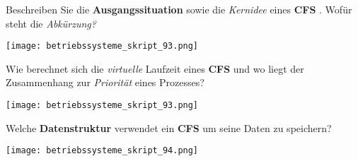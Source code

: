 \documentclass{article}
\begin{document}
\begin{tcolorbox}[colback=white!10!white,colframe=lightgray!75!black,
  savelowerto=\jobname_ex.tex,breakable,enhanced,lines before break=40]

\begin{center}
Beschreiben Sie die 
\textbf{Ausgangssituation
} sowie die 
\textit{Kernidee
} eines 
\textbf{CFS
}. Wofür steht die 
\textit{Abkürzung?
}
\end{center}

\tcblower

\justifying
\begin{center}
\texttt{[image: betriebssysteme\_skript\_93.png]}
\end{center}

\end{tcolorbox}
\begin{tcolorbox}[colback=white!10!white,colframe=lightgray!75!black,
  savelowerto=\jobname_ex.tex,breakable,enhanced,lines before break=40]

\begin{center}
Wie berechnet sich die 
\textit{virtuelle
} Laufzeit eines 
\textbf{CFS
} und wo liegt der Zusammenhang zur 
\textit{Priorität
} eines Prozesses?

\end{center}

\tcblower

\justifying
\begin{center}
\texttt{[image: betriebssysteme\_skript\_93.png]}
\end{center}

\end{tcolorbox}
\begin{tcolorbox}[colback=white!10!white,colframe=lightgray!75!black,
  savelowerto=\jobname_ex.tex,breakable,enhanced,lines before break=40]

\begin{center}
Welche 
\textbf{Datenstruktur
} verwendet ein 
\textbf{CFS
} um seine Daten zu speichern?

\end{center}

\tcblower

\justifying
\begin{center}
\texttt{[image: betriebssysteme\_skript\_94.png]}
\end{center}

\end{tcolorbox}
\end{document}
